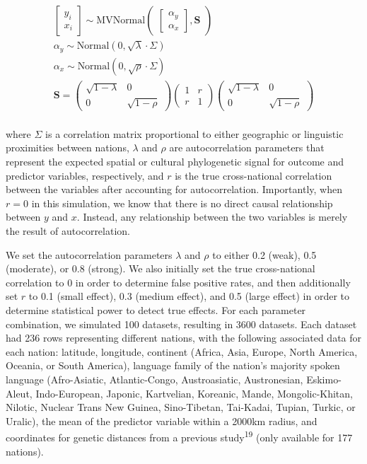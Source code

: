 \documentclass[
  man,floatsintext]{apa6}
\begin{document}
\begin{gather*}
\begin{bmatrix}y_i\\x_i \end{bmatrix} \sim \text{MVNormal}
\begin{pmatrix}\begin{bmatrix}\alpha_y\\\alpha_x \end{bmatrix},\textbf{S}\end{pmatrix}\\
\alpha_y \sim \text{Normal}(0, \sqrt{\lambda} \cdot \Sigma) \\
\alpha_x \sim \text{Normal}(0, \sqrt{\rho} \cdot \Sigma) \\
\textbf{S} = 
\begin{pmatrix}\sqrt{1 - \lambda} & 0 \\ 0 & \sqrt{1 - \rho} \end{pmatrix}
\begin{pmatrix}1 & r \\ r & 1\end{pmatrix}
\begin{pmatrix}\sqrt{1 - \lambda} & 0 \\ 0 & \sqrt{1 - \rho} \end{pmatrix}
\\
\end{gather*}

where \(\Sigma\) is a correlation matrix proportional to either geographic or linguistic proximities between nations, \(\lambda\) and \(\rho\) are autocorrelation parameters that represent the expected spatial or cultural phylogenetic signal for outcome and predictor variables, respectively, and \(r\) is the true cross-national correlation between the variables after accounting for autocorrelation. Importantly, when \(r = 0\) in this simulation, we know that there is no direct causal relationship between \(y\) and \(x\). Instead, any relationship between the two variables is merely the result of autocorrelation.

We set the autocorrelation parameters \(\lambda\) and \(\rho\) to either 0.2 (weak), 0.5 (moderate), or 0.8 (strong). We also initially set the true cross-national correlation to 0 in order to determine false positive rates, and then additionally set \(r\) to 0.1 (small effect), 0.3 (medium effect), and 0.5 (large effect) in order to determine statistical power to detect true effects. For each parameter combination, we simulated 100 datasets, resulting in 3600 datasets. Each dataset had 236 rows representing different nations, with the following associated data for each nation: latitude, longitude, continent (Africa, Asia, Europe, North America, Oceania, or South America), language family of the nation's majority spoken language (Afro-Asiatic, Atlantic-Congo, Austroasiatic, Austronesian, Eskimo-Aleut, Indo-European, Japonic, Kartvelian, Koreanic, Mande, Mongolic-Khitan, Nilotic, Nuclear Trans New Guinea, Sino-Tibetan, Tai-Kadai, Tupian, Turkic, or Uralic), the mean of the predictor variable within a 2000km radius, and coordinates for genetic distances from a previous study\textsuperscript{19} (only available for 177 nations).
\end{document}
